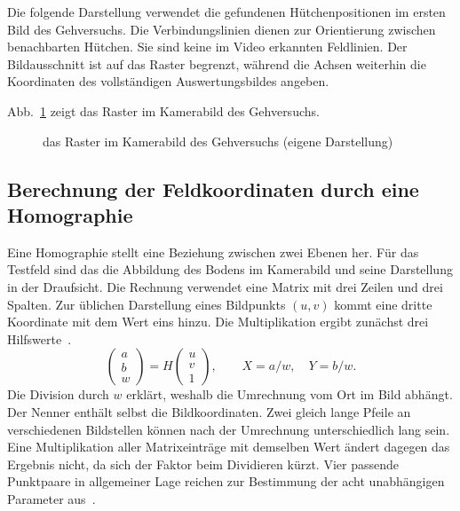 Die folgende Darstellung verwendet die gefundenen Hütchenpositionen im ersten Bild des Gehversuchs. Die Verbindungslinien dienen zur Orientierung zwischen benachbarten Hütchen. Sie sind keine im Video erkannten Feldlinien. Der Bildausschnitt ist auf das Raster begrenzt, während die Achsen weiterhin die Koordinaten des vollständigen Auswertungsbildes angeben.

Abb.~\ref{abb:em-persp} zeigt das Raster im Kamerabild des Gehversuchs.
\begin{figure}[htbp]\centering
{}
\caption{das Raster im Kamerabild des Gehversuchs (eigene Darstellung)}\label{abb:em-persp}\end{figure}

\subsection{Berechnung der Feldkoordinaten durch eine Homographie}
Eine Homographie stellt eine Beziehung zwischen zwei Ebenen her. Für das Testfeld sind das die Abbildung des Bodens im Kamerabild und seine Darstellung in der Draufsicht. Die Rechnung verwendet eine Matrix mit drei Zeilen und drei Spalten. Zur üblichen Darstellung eines Bildpunkts $(u,v)$ kommt eine dritte Koordinate mit dem Wert eins hinzu. Die Multiplikation ergibt zunächst drei Hilfswerte~\cite{em-opencv-homographie}.
\[
\begin{pmatrix}a\\b\\w\end{pmatrix}
=H\begin{pmatrix}u\\v\\1\end{pmatrix},
\qquad X=a/w,\quad Y=b/w.
\]
Die Division durch $w$ erklärt, weshalb die Umrechnung vom Ort im Bild abhängt. Der Nenner enthält selbst die Bildkoordinaten. Zwei gleich lange Pfeile an verschiedenen Bildstellen können nach der Umrechnung unterschiedlich lang sein. Eine Multiplikation aller Matrixeinträge mit demselben Wert ändert dagegen das Ergebnis nicht, da sich der Faktor beim Dividieren kürzt. Vier passende Punktpaare in allgemeiner Lage reichen zur Bestimmung der acht unabhängigen Parameter aus~\cite{em-opencv-homographie}.

